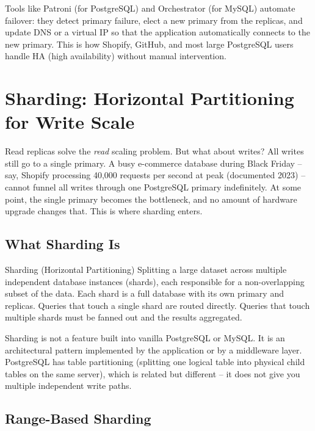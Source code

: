 \documentclass[11pt,a4paper]{article}
\begin{document}
Tools like Patroni (for PostgreSQL) and Orchestrator (for MySQL) automate failover: they detect primary failure, elect a new primary from the replicas, and update DNS or a virtual IP so that the application automatically connects to the new primary. This is how Shopify, GitHub, and most large PostgreSQL users handle HA (high availability) without manual intervention.

\newpage

\section{Sharding: Horizontal Partitioning for Write Scale}

Read replicas solve the \emph{read} scaling problem. But what about writes? All writes still go to a single primary. A busy e-commerce database during Black Friday -- say, Shopify processing 40,000 requests per second at peak (documented 2023) -- cannot funnel all writes through one PostgreSQL primary indefinitely. At some point, the single primary becomes the bottleneck, and no amount of hardware upgrade changes that. This is where sharding enters.

\subsection{What Sharding Is}

\begin{termbox}{Sharding (Horizontal Partitioning)}
Splitting a large dataset across multiple independent database instances (shards), each responsible for a non-overlapping subset of the data. Each shard is a full database with its own primary and replicas. Queries that touch a single shard are routed directly. Queries that touch multiple shards must be fanned out and the results aggregated.
\end{termbox}

Sharding is not a feature built into vanilla PostgreSQL or MySQL. It is an architectural pattern implemented by the application or by a middleware layer. PostgreSQL has table partitioning (splitting one logical table into physical child tables on the same server), which is related but different -- it does not give you multiple independent write paths.

\subsection{Range-Based Sharding}
\end{document}
